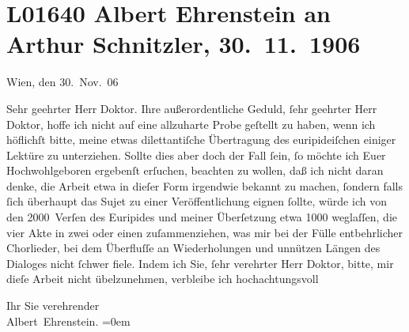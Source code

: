 

\section[Albert Ehrenstein an Arthur Schnitzler, 30. 11. 1906]{L01640 Albert Ehrenstein an Arthur Schnitzler, 30. 11. 1906}
\nopagebreak{}
\rehead{ }\normalsize\beginnumbering{}
\toendnotes[C]{\smallbreak\pagebreak[2]}
\toendnotes[C]{\smallbreak}
\pstart
           \raggedleft{}{\pb}Wien, den 30. Nov. 06\pend
           
\pstart{}Sehr geehrter Herr Doktor.\pend\vspace{0.5em}
\pstart
           Ihre außerordentliche Geduld, ſehr geehrter Herr Doktor, hoffe ich nicht auf eine
               allzuharte Probe geſtellt zu haben, wenn ich höflichſt bitte, meine etwas
               dilettantiſche Übertragung des euripideiſchen\label{K_L01640-1v}\label{K_L01640-1} einiger Lektüre zu
               unterziehen. Sollte dies aber doch der Fall ſein, ſo möchte ich Euer Hochwohlgeboren
               ergebenſt erſuchen, beachten zu wollen, daß ich nicht daran denke, die Arbeit etwa in
               dieſer Form {\pb}irgendwie bekannt zu machen,
               ſondern falls ſich überhaupt das Sujet zu einer Veröffentlichung eignen ſollte, würde
               ich von den 2000 Verſen des Euripides und
               meiner Überſetzung etwa 1000 weglaſſen, die vier Akte in zwei oder einen
               zuſammenziehen, was mir bei der Fülle entbehrlicher Chorlieder, bei dem Überfluſſe an
               Wiederholungen und unnützen Längen des Dialoges nicht ſchwer fiele. Indem ich Sie,
               ſehr verehrter Herr Doktor, bitte, mir dieſe Arbeit nicht übelzunehmen, verbleibe ich
               hochachtungsvoll\pend
           
\pstart
           Ihr Sie verehrender{\\[\baselineskip]}\spacefill\mbox{Albert Ehrenstein.}\pend
           \leftskip=0em{}\endnumbering{}  
      
